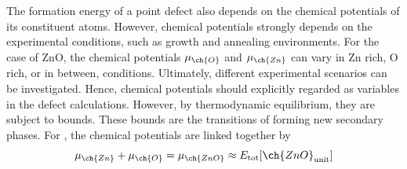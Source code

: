 The formation energy of a point defect also depends on the chemical potentials of its constituent atoms. However, chemical potentials strongly depends on the experimental conditions, such as growth and annealing environments. For the case of ZnO, the chemical potentials $\mu_{\ch{O}}$ and $\mu_{\ch{Zn}}$ can vary in Zn rich, O rich, or in between, conditions. Ultimately, different experimental scenarios can be investigated. Hence, chemical potentials should explicitly regarded as variables in the defect calculations.  However, by thermodynamic equilibrium, they are subject to bounds. These bounds are the transitions of forming new secondary phases. For , the chemical potentials are linked together by \citep{Freysoldt2014}
\begin{equation}
	\mu_{\ch{Zn}} +    \mu_{\ch{O}} =     \mu_{\ch{ZnO}} \approx E_{\text{tot}}[\ch{ZnO}_{\text{unit}}]
\end{equation}

